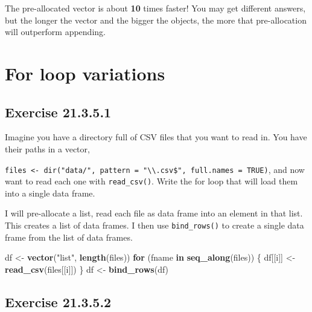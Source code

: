 \documentclass[]{book}
\newenvironment{Shaded}{\begin{snugshade}}{\end{snugshade}}
\newcommand{\ControlFlowTok}[1]{\textcolor[rgb]{0.13,0.29,0.53}{\textbf{#1}}}
\newcommand{\KeywordTok}[1]{\textcolor[rgb]{0.13,0.29,0.53}{\textbf{#1}}}
\newcommand{\NormalTok}[1]{#1}
\newcommand{\StringTok}[1]{\textcolor[rgb]{0.31,0.60,0.02}{#1}}
\theoremstyle{plain}
\theoremstyle{remark}
\begin{document}
The pre-allocated vector is about \textbf{10} times faster! You may get
different answers, but the longer the vector and the bigger the objects,
the more that pre-allocation will outperform appending.

\hypertarget{for-loop-variations}{%
\section{For loop variations}\label{for-loop-variations}}

\hypertarget{exercise-21.3.5.1}{%
\subsection*{\texorpdfstring{Exercise
{21.3.5.1}}{Exercise 21.3.5.1}}\label{exercise-21.3.5.1}}

Imagine you have a directory full of CSV files that you want to read in.
You have their paths in a vector,

\texttt{files\ \textless{}-\ dir("data/",\ pattern\ =\ "\textbackslash{}\textbackslash{}.csv\$",\ full.names\ =\ TRUE)},
and now want to read each one with \texttt{read\_csv()}. Write the for
loop that will load them into a single data frame.

I will pre-allocate a list, read each file as data frame into an element
in that list. This creates a list of data frames. I then use
\texttt{bind\_rows()} to create a single data frame from the list of
data frames.

\begin{Shaded}
\begin{Highlighting}[]
\NormalTok{df <-}\StringTok{ }\KeywordTok{vector}\NormalTok{(}\StringTok{"list"}\NormalTok{, }\KeywordTok{length}\NormalTok{(files))}
\ControlFlowTok{for}\NormalTok{ (fname }\ControlFlowTok{in} \KeywordTok{seq_along}\NormalTok{(files)) \{}
\NormalTok{  df[[i]] <-}\StringTok{ }\KeywordTok{read_csv}\NormalTok{(files[[i]])}
\NormalTok{\}}
\NormalTok{df <-}\StringTok{ }\KeywordTok{bind_rows}\NormalTok{(df)}
\end{Highlighting}
\end{Shaded}

\hypertarget{exercise-21.3.5.2}{%
\subsection*{\texorpdfstring{Exercise
{21.3.5.2}}{Exercise 21.3.5.2}}\label{exercise-21.3.5.2}}
\end{document}
